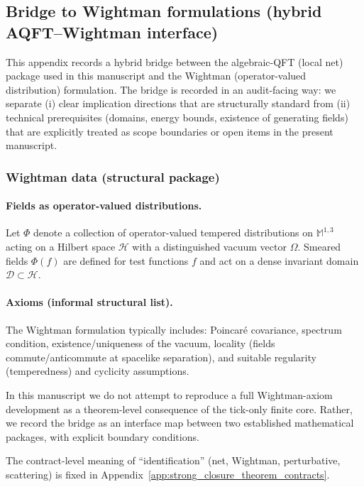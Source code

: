 \subsection{Bridge to Wightman formulations (hybrid AQFT--Wightman interface)}
\label{app:wightman_bridge_and_reconstruction}

This appendix records a hybrid bridge between the algebraic-QFT (local net) package used in this manuscript and the Wightman (operator-valued distribution) formulation.
The bridge is recorded in an audit-facing way: we separate (i) clear implication directions that are structurally standard from (ii) technical prerequisites (domains, energy bounds, existence of generating fields) that are explicitly treated as scope boundaries or open items in the present manuscript.

\subsubsection{Wightman data (structural package)}
\paragraph{Fields as operator-valued distributions.}
Let $\Phi$ denote a collection of operator-valued tempered distributions on $\mathbb{M}^{1,3}$ acting on a Hilbert space $\mathcal{H}$ with a distinguished vacuum vector $\Omega$.
Smeared fields $\Phi(f)$ are defined for test functions $f$ and act on a dense invariant domain $\mathcal{D}\subset\mathcal{H}$.

\paragraph{Axioms (informal structural list).}
The Wightman formulation typically includes: Poincar\'e covariance, spectrum condition, existence/uniqueness of the vacuum, locality (fields commute/anticommute at spacelike separation), and suitable regularity (temperedness) and cyclicity assumptions.

\AuditTag In this manuscript we do not attempt to reproduce a full Wightman-axiom development as a theorem-level consequence of the tick-only finite core.
Rather, we record the bridge as an interface map between two established mathematical packages, with explicit boundary conditions.

\AuditTag The contract-level meaning of ``identification'' (net, Wightman, perturbative, scattering) is fixed in Appendix~\ref{app:strong_closure_theorem_contracts}.

